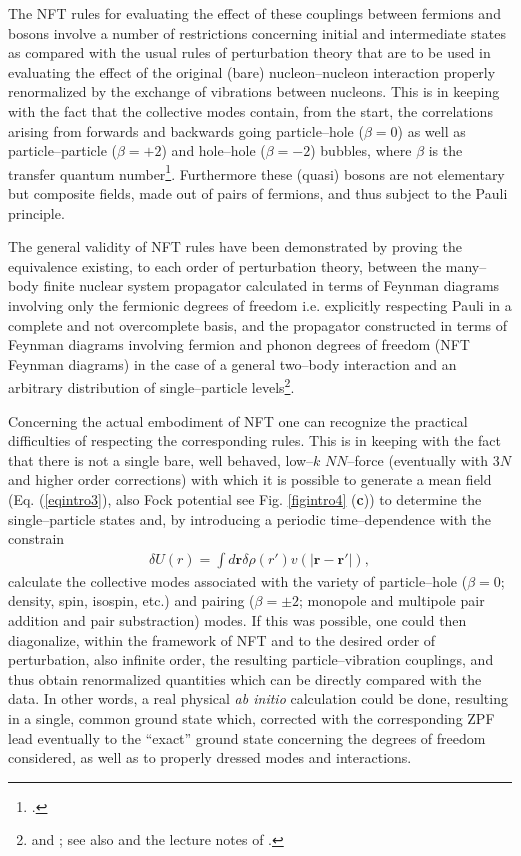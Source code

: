 The NFT rules  for evaluating the effect of these couplings between fermions and bosons involve a number of restrictions concerning initial and intermediate states as compared with the usual rules of perturbation theory that are to be used in evaluating the effect of the original (bare) nucleon--nucleon interaction properly renormalized by  the exchange of vibrations between nucleons. This is in keeping with the fact that the collective modes contain, from the start,  the correlations arising from forwards and backwards going  particle--hole ($\beta=0$) as well as particle--particle ($\beta=+2$) and hole--hole ($\beta=-2$) bubbles, where $\beta$ is the transfer quantum number\footnote{\cite{Bohr:64}.}. Furthermore  these (quasi) bosons are not elementary but composite fields, made out of pairs of fermions, and thus subject to the Pauli principle. 
 

The general validity of NFT rules have been demonstrated by proving the equivalence existing, to each order of perturbation theory, between the many--body finite nuclear system propagator calculated in terms of Feynman diagrams involving only the fermionic degrees of freedom i.e. explicitly respecting Pauli in a complete and not overcomplete basis, and the propagator constructed in terms of Feynman diagrams involving fermion and phonon degrees of freedom (NFT Feynman diagrams) in the case of a general two--body interaction and an arbitrary distribution of single--particle levels\footnote{\cite{Bes:75} and \cite{Bes:76c}; see also \cite{Baranger:69} and the  lecture notes of  \cite{McFarlane:69}.}.



 Concerning the actual embodiment of NFT one can recognize the practical difficulties of respecting the corresponding rules. This is in keeping with the fact that there is not a single bare, well behaved, low--$k$ $NN$--force (eventually with 3$N$ and higher order corrections) with which it is possible to generate a mean field (Eq. (\ref{eqintro3}), also Fock potential see Fig. \ref{figintro4} (\textbf{c})) to determine the single--particle states and, by introducing a periodic time--dependence with the constrain
\begin{align}\label{eq1.5.1}
\delta U(r)=\int d\mathbf{r} \delta \rho(r') v(|\mathbf r- \mathbf r'|),
\end{align}
calculate the collective modes associated with the variety of particle--hole ($\beta=0$; density, spin, isospin, etc.) and pairing ($\beta=\pm2$; monopole and multipole pair addition and pair substraction) modes. If this was possible, one could then diagonalize, within the framework of NFT and to the desired order of perturbation, also infinite order, the resulting particle--vibration couplings, and thus obtain renormalized quantities which can be directly compared with the data.
 In other words, a real physical \textit{ab initio} calculation could be done, resulting in a single,  common ground state which, corrected with the corresponding  ZPF lead eventually to the ``exact'' ground state concerning the degrees of freedom considered, as well as to properly dressed modes and  interactions.



